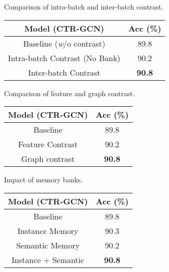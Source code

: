 \documentclass{article} \usepackage{iclr2023_conference,times}
\begin{document}
\begin{minipage}{\textwidth}
\begin{minipage}[t]{0.3\textwidth}
\centering
\makeatletter{}
\setlength\tabcolsep{2.5pt}
\scriptsize
\caption{Comparison of intra-batch and inter-batch contrast.}
    \begin{tabular}{c||c}
\rowcolor{gray!30} Model (CTR-GCN) & Acc (\%) \\
       \hline \hline
        Baseline (\textit{w}/o contrast) & 89.8 \\\hline
        Intra-batch Contrast (No Bank) & 90.2 \\
        Inter-batch Contrast & \textbf{90.8} \\\hline
    \end{tabular}
    \label{tab: intra and inter batch}
\end{minipage}
\hspace{3mm}
\begin{minipage}[t]{0.3\textwidth}
\centering
\makeatletter{}
\setlength\tabcolsep{2.5pt}
   \scriptsize
   \caption{Comparison of feature and graph contrast.}
    \begin{tabular}{c||c}
\rowcolor{gray!30} Model (CTR-GCN) & Acc (\%) \\
       \hline \hline
        Baseline & 89.8 \\\hline
        Feature Contrast & 90.2 \\
        Graph contrast & \textbf{90.8} \\\hline
    \end{tabular}
\label{table:feature contrast and graph contrast}
\end{minipage}
\hspace{3mm}
\begin{minipage}[t]{0.3\textwidth}
\centering
\makeatletter{}
\setlength\tabcolsep{2.5pt}
   \scriptsize
   \caption{Impact of memory banks.}
    \begin{tabular}{c||c}
\rowcolor{gray!30} Model (CTR-GCN) & Acc (\%) \\
       \hline \hline
        Baseline & 89.8 \\\hline
        Instance Memory & 90.3 \\
        Semantic Memory & 90.2 \\
        \hline
        Instance + Semantic & \textbf{90.8} \\
        \hline
    \end{tabular}
\label{table:memory banks}
\end{minipage}


\end{minipage}
\end{document}

